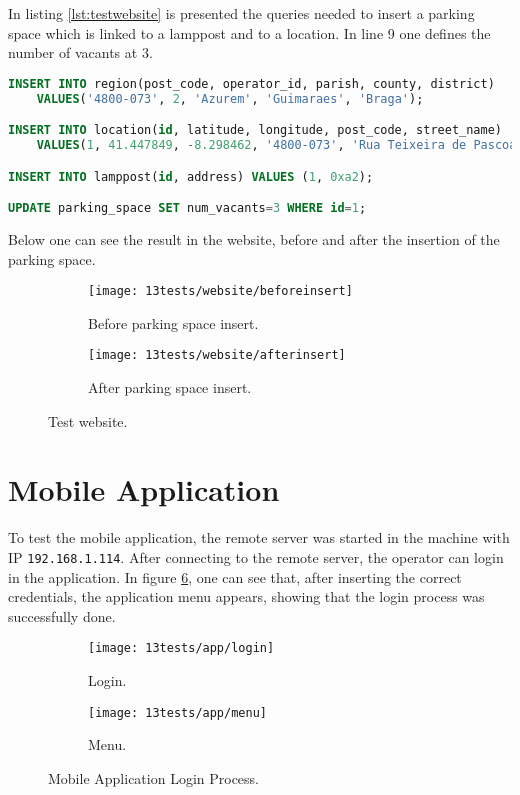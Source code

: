 In listing \ref{lst:testwebsite} is presented the queries needed to insert a parking space which is linked to a lamppost and to a location. In line 9 one defines the number of vacants at 3.

\begin{lstlisting}[language=SQL, caption={Test Website: add parking space to the database.}, label={lst:testwebsite}]
INSERT INTO region(post_code, operator_id, parish, county, district) 
	VALUES('4800-073', 2, 'Azurem', 'Guimaraes', 'Braga');

INSERT INTO location(id, latitude, longitude, post_code, street_name) 
	VALUES(1, 41.447849, -8.298462, '4800-073', 'Rua Teixeira de Pascoais');

INSERT INTO lamppost(id, address) VALUES (1, 0xa2);

UPDATE parking_space SET num_vacants=3 WHERE id=1;
\end{lstlisting}

Below one can see the result in the website, before and after the insertion of the parking space.

\begin{figure}[H]
	\centering
	\begin{subfigure}{.4\textwidth}
		\centering
		\texttt{[image: 13tests/website/beforeinsert]}
		\caption{Before parking space insert.}
		\label{fig:login}
	\end{subfigure}%
	\begin{subfigure}{.4\textwidth}
		\centering
		\texttt{[image: 13tests/website/afterinsert]}
		\caption{After parking space insert.}
		\label{fig:menu}
	\end{subfigure}
	\caption{Test website.}
	\label{fig:applogin}
\end{figure}

\clearpage
\section{Mobile Application}

To test the mobile application, the remote server was started in the machine with IP \verb|192.168.1.114|. After connecting to the remote server, the operator can login in the application. In figure \ref{fig:applogin}, one can see that, after inserting the correct credentials, the application menu appears, showing that the login process was successfully done.

\begin{figure}[H]
	\centering
	\begin{subfigure}{.4\textwidth}
		\centering
		\texttt{[image: 13tests/app/login]}
		\caption{Login.}
		\label{fig:login}
	\end{subfigure}%
	\begin{subfigure}{.4\textwidth}
		\centering
		\texttt{[image: 13tests/app/menu]}
		\caption{Menu.}
		\label{fig:menu}
	\end{subfigure}
	\caption{Mobile Application Login Process.}
	\label{fig:applogin}
\end{figure}

